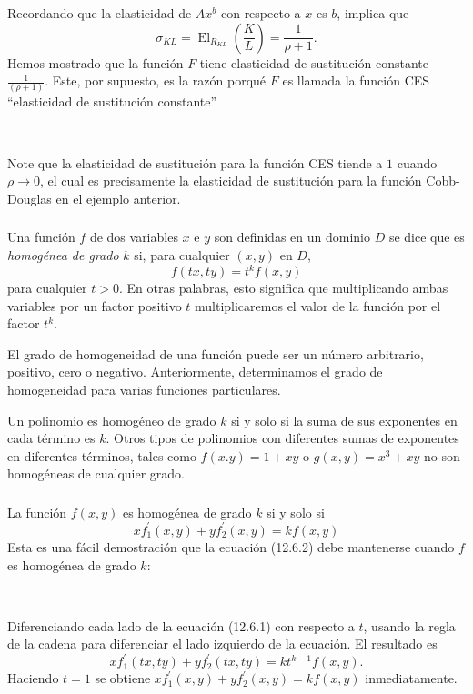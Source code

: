 \begin{frame}[t]
\frametitle{\secname}
\begin{proofs}
Recordando que la elasticidad de $Ax^{b}$ con respecto a $x$ es $b$, implica que \[ \sigma_{KL}=\operatorname{El}_{R_{KL}}\left(\frac{K}{L}\right)=\frac{1}{\rho+1}. \] Hemos mostrado que la función $F$ tiene elasticidad de sustitución constante $\frac{1}{\left(\rho+1\right)}$. Este, por supuesto, es la razón porqué $F$ es llamada la función \textsc{CES} ``elasticidad de sustitución constante''
\end{proofs}

\

\begin{remark}
Note que la elasticidad de sustitución para la función \textsc{CES} tiende a $1$ cuando $\rho\to0$, el cual es precisamente la elasticidad de sustitución para la función Cobb-Douglas en el ejemplo anterior.
\end{remark}
\end{frame}

\begin{frame}[t]
\frametitle{\secname}
\begin{definition}
Una función $f$ de dos variables $x$ e $y$ son definidas en un dominio $D$ se dice que es \emph{homogénea de grado} $k$ si, para cualquier $\left(x,y\right)$ en $D$, \[ f\left(tx,ty\right)=t^{k}f\left(x,y\right) \] para cualquier $t>0$. En otras palabras, esto significa que multiplicando ambas variables por un factor positivo $t$ multiplicaremos el valor de la función por el factor $t^{k}$.
\end{definition}
El grado de homogeneidad de una función puede ser un número arbitrario, positivo, cero o negativo. Anteriormente, determinamos el grado de homogeneidad para varias funciones particulares.

Un polinomio es homogéneo de grado $k$ si y solo si la suma de sus exponentes en cada término es $k$. Otros tipos de polinomios con diferentes sumas de exponentes en diferentes términos, tales como $f\left(x.y\right)=1+xy$ o $g\left(x,y\right)=x^{3}+xy$ no son homogéneas de cualquier grado.
\end{frame}

\begin{frame}[t]
\frametitle{\secname}
La función $f\left(x,y\right)$ es homogénea de grado $k$ si y solo si
\begin{equation}
xf^{\prime}_{1}\left(x,y\right)+yf^{\prime}_{2}\left(x,y\right)=kf\left(x,y\right)
\end{equation}
Esta es una fácil demostración que la ecuación (12.6.2) debe mantenerse cuando $f$ es homogénea de grado $k$:

\

Diferenciando cada lado de la ecuación (12.6.1) con respecto a $t$, usando la regla de la cadena para diferenciar el lado izquierdo de la ecuación. El resultado es \[ xf^{\prime}_{1}\left(tx,ty\right)+yf^{\prime}_{2}\left(tx,ty\right)=kt^{k-1}f\left(x,y\right). \] Haciendo $t=1$ se obtiene $xf^{\prime}_{1}\left(x,y\right)+yf^{\prime}_{2}\left(x,y\right)=kf\left(x,y\right)$ inmediatamente.
\end{frame}


